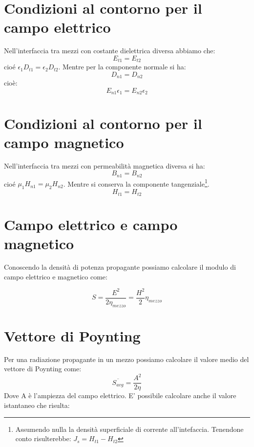 \documentclass[10pt,a4paper]{report}
\begin{document}
	\section{Condizioni al contorno per il campo elettrico}

		Nell'interfaccia tra mezzi con costante dielettrica diversa abbiamo che:
		\begin{equation}
		E_{t1}=E_{t2} 
		\end{equation}
		cioé $\epsilon_1 D_{t1} = \epsilon_2 D_{t2}$.
		Mentre per la componente normale si ha:
		\begin{equation}
		D_{n1} = D_{n2}
		\end{equation}
		cioè:
		\begin{equation}
		E_{n1}\epsilon_1=E_{n2}\epsilon_2
		\end{equation}

	\section{Condizioni al contorno per il campo magnetico}
		Nell'interfaccia tra mezzi con permeabilità magnetica diversa si ha:
		\begin{equation}
		B_{n1}=B_{n2} 
		\end{equation}
		cioé $\mu_1 H_{n1} = \mu_2 H_{n2}$.
		Mentre si conserva la componente tangenziale\footnote{Assumendo nulla la densità superficiale di corrente all'intefaccia. Tenendone conto risulterebbe: $J_s=H_{t1}-H_{t2}$}.
		\begin{equation}
		H_{t1}=H_{t2}
		\end{equation}

	\section{Campo elettrico e campo magnetico}

	Conoscendo la densità di potenza propagante possiamo calcolare il modulo di campo elettrico e magnetico come:

	\begin{equation}
	S=\frac{E^2}{2\eta_{mezzo}}=\frac{H^2}{2}\eta_{mezzo}
	\end{equation}

	\section{Vettore di Poynting}
		Per una radiazione propagante in un mezzo possiamo calcolare il valore medio del vettore di Poynting come:
		\begin{equation}
		\overline{S_{avg}}=\frac{A^2}{2\eta}
		\end{equation}
		Dove A è l'ampiezza del campo elettrico.
		E' possibile calcolare anche il valore istantaneo che risulta:
\end{document}
